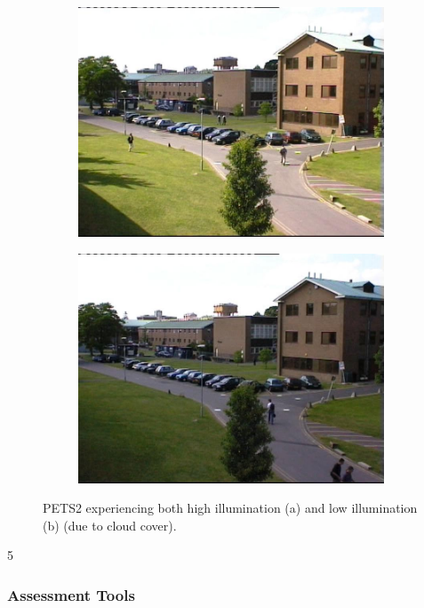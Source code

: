 \begin{figure}
\centering
\begin{subfigure}{.48\linewidth}
  \includegraphics[width=1\linewidth]{figures/PETS2_highv.jpg}
  \caption{}
\end{subfigure}
\hfill
\begin{subfigure}{.48\linewidth}
  \includegraphics[width=1\linewidth]{figures/PETS2_lowv.jpg}
  \caption{}
\end{subfigure}
\caption{PETS2 experiencing both high illumination (a) and low illumination (b) (due to cloud cover).}
\label{fig:pets2illum}
\end{figure}
5
\subsubsection{Assessment Tools}

